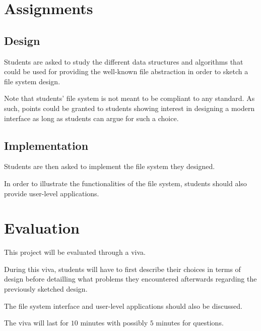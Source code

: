 \section{Assignments}


\subsection*{Design}

Students are asked to study the different data structures and algorithms
that could be used for providing the well-known file abstraction in
order to sketch a file system design.

Note that students' file system is not meant to be compliant to any standard.
As such, points could be granted to students showing interest in designing
a modern interface as long as students can argue for such a choice.


\subsection*{Implementation}

Students are then asked to implement the file system they designed.

In order to illustrate the functionalities of the file system, students
should also provide user-level applications.

%
%

\section{Evaluation}

This project will be evaluated through a viva.

During this viva, students will have to first describe their choices in
terms of design before detailling what problems they encountered afterwards
regarding the previously sketched design.

The file system interface and user-level applications should also be discussed.

The viva will last for $10$ minutes with possibly $5$ minutes for questions.

